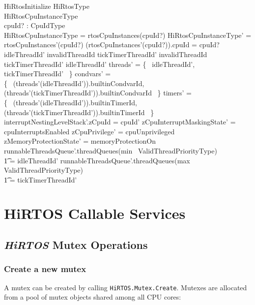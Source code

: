 \documentclass{AUJarticle}
\begin{document}
\begin{schema}{HiRtosInitialize}
   \Delta HiRtosType \\
   \Delta HiRtosCpuInstanceType \\
   cpuId? : CpuIdType \\
\where
   \theta HiRtosCpuInstanceType = rtosCpuInstances(cpuId?)
\also
   \theta HiRtosCpuInstanceType' = rtosCpuInstances'(cpuId?)
\also
   (rtosCpuInstances'(cpuId?)).cpuId = cpuId?
\also
    idleThreadId' \neq invalidThreadId
\also
    tickTimerThreadId' \neq invalidThreadId
\also
    tickTimerThreadId' \neq idleThreadId'
\also
    \dom threads' = \{~ idleThreadId', tickTimerThreadId' ~\}
\also
    \dom condvars' = \\
   \{~ (threads'(idleThreadId')).builtinCondvarId, \\
      (threads'(tickTimerThreadId')).builtinCondvarId ~\}
\also
    \dom timers' = \\
   \{~ (threads'(idleThreadId')).builtinTimerId, \\
       (threads'(tickTimerThreadId')).builtinTimerId ~\}
\also
   interruptNestingLevelStack'.zCpuId = cpuId'
\also
    zCpuInterruptMaskingState' = cpuInterruptsEnabled
\also
    zCpuPrivilege' = cpuUnprivileged
\also
    zMemoryProtectionState' = memoryProtectionOn
\also
    runnableThreadsQueue'.threadQueues(min~ ValidThreadPriorityType) \\
    \t1 = \langle idleThreadId' \rangle
\also
    runnableThreadsQueue'.threadQueues(max~ ValidThreadPriorityType) \\
    \t1 = \langle tickTimerThreadId' \rangle
\end{schema}

\section{HiRTOS Callable Services}

\subsection{\emph{HiRTOS} Mutex Operations}

\subsubsection{Create a new mutex}

A mutex can be created by calling \verb`HiRTOS.Mutex.Create`. Mutexes are allocated from a pool of
mutex objects shared among all CPU cores:
\end{document}
